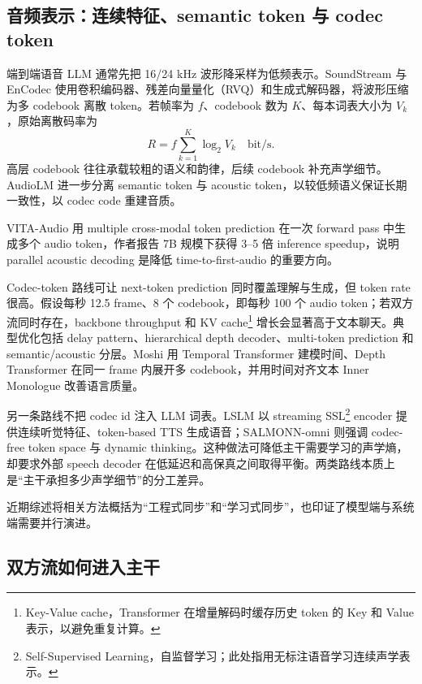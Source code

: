 \documentclass[UTF8,fontset=none,a4paper,10pt]{ctexart}
\begin{document}
\subsection{音频表示：连续特征、semantic token 与 codec token}

端到端语音 LLM 通常先把 16/24 kHz 波形降采样为低频表示。SoundStream 与 EnCodec 使用卷积编码器、残差向量量化（RVQ）和生成式解码器，将波形压缩为多 codebook 离散 token\cite{zh:zeghidour2021soundstream,zh:defossez2022encodec}。若帧率为 $f$、codebook 数为 $K$、每本词表大小为 $V_k$，原始离散码率为
\begin{equation}
R=f\sum_{k=1}^{K}\log_2V_k\quad\text{bit/s}.
\end{equation}
高层 codebook 往往承载较粗的语义和韵律，后续 codebook 补充声学细节。AudioLM 进一步分离 semantic token 与 acoustic token，以较低频语义保证长期一致性，以 codec code 重建音质\cite{zh:borsos2022audiolm}。

VITA-Audio 用 multiple cross-modal token prediction 在一次 forward pass 中生成多个 audio token，作者报告 7B 规模下获得 3--5 倍 inference speedup\cite{zh:long2025vitaaudio}，说明 parallel acoustic decoding 是降低 time-to-first-audio 的重要方向。

Codec-token 路线可让 next-token prediction 同时覆盖理解与生成，但 token rate 很高。假设每秒 12.5 frame、8 个 codebook，即每秒 100 个 audio token；若双方流同时存在，backbone throughput 和 KV cache\footnote{Key-Value cache，Transformer 在增量解码时缓存历史 token 的 Key 和 Value 表示，以避免重复计算。} 增长会显著高于文本聊天。典型优化包括 delay pattern、hierarchical depth decoder、multi-token prediction 和 semantic/acoustic 分层。Moshi 用 Temporal Transformer 建模时间、Depth Transformer 在同一 frame 内展开多 codebook，并用时间对齐文本 Inner Monologue 改善语言质量\cite{zh:defossez2024moshi}。

另一条路线不把 codec id 注入 LLM 词表。LSLM 以 streaming SSL\footnote{Self-Supervised Learning，自监督学习；此处指用无标注语音学习连续声学表示。} encoder 提供连续听觉特征、token-based TTS 生成语音；SALMONN-omni 则强调 codec-free token space 与 dynamic thinking\cite{zh:ma2025lslm,zh:yu2025salmonnomni}。这种做法可降低主干需要学习的声学熵，却要求外部 speech decoder 在低延迟和高保真之间取得平衡。两类路线本质上是“主干承担多少声学细节”的分工差异。

近期综述将相关方法概括为“工程式同步”和“学习式同步”，也印证了模型端与系统端需要并行演进\cite{zh:chen2025survey}。

\subsection{双方流如何进入主干}
\end{document}
